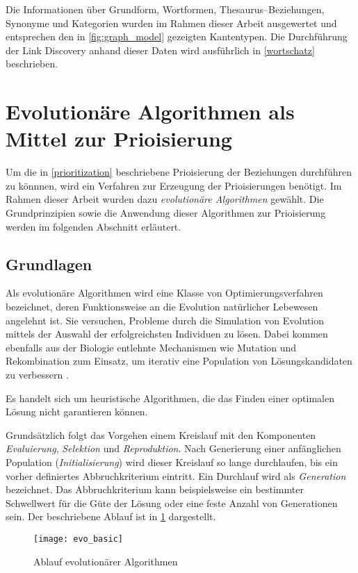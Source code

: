 Die Informationen über Grundform, Wortformen, Thesaurus--Beziehungen, Synonyme und Kategorien wurden im Rahmen dieser Arbeit ausgewertet und entsprechen den in \cref{fig:graph_model} gezeigten Kantentypen. Die Durchführung der Link Discovery anhand dieser Daten wird ausführlich in \cref{wortschatz} beschrieben.

\section{Evolutionäre Algorithmen als Mittel zur Prioisierung}

Um die in \cref{prioritization} beschriebene Prioisierung der Beziehungen durchführen zu könnnen, wird ein Verfahren zur Erzeugung der Prioisierungen benötigt. Im Rahmen dieser Arbeit wurden dazu \emph{evolutionäre Algorithmen} gewählt. Die Grundprinzipien sowie die Anwendung dieser Algorithmen zur Prioisierung werden im folgenden Abschnitt erläutert.

\subsection{Grundlagen}
\label{evo}

Als evolutionäre Algorithmen wird eine Klasse von Optimierungsverfahren bezeichnet, deren Funktionsweise an die Evolution natürlicher Lebewesen angelehnt ist. Sie versuchen, Probleme durch die Simulation von Evolution mittels der Auswahl der erfolgreichsten Individuen zu lösen. Dabei kommen ebenfalls aus der Biologie entlehnte Mechanismen wie Mutation und Rekombination zum Einsatz, um iterativ eine Population von Lösungskandidaten zu verbessern \cite{tw2008}.

Es handelt sich um heuristische Algorithmen, die das Finden einer optimalen Lösung nicht garantieren können.

Grundsätzlich folgt das Vorgehen einem Kreislauf mit den Komponenten \emph{Evaluierung}, \emph{Selektion} und \emph{Reproduktion}. Nach Generierung einer anfänglichen Population (\emph{Initialisierung}) wird dieser Kreislauf so lange durchlaufen, bis ein vorher definiertes Abbruchkriterium eintritt. Ein Durchlauf wird als \emph{Generation} bezeichnet. Das Abbruchkriterium kann beispielsweise ein bestimmter Schwellwert für die Güte der Lösung oder eine feste Anzahl von Generationen sein. Der beschriebene Ablauf ist in \cref{fig:evo_basic} dargestellt.

\begin{figure}
\centering
\texttt{[image: evo\_basic]}
\caption{Ablauf evolutionärer Algorithmen}
\label{fig:evo_basic}
\end{figure}

